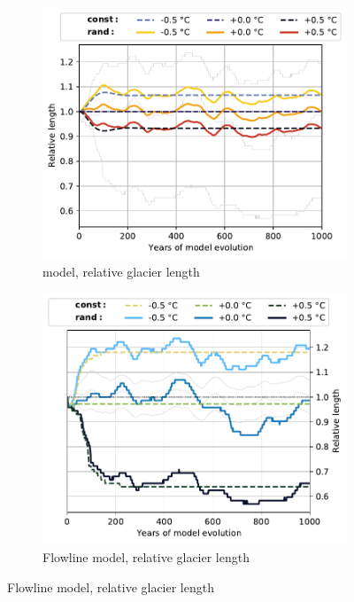 \begin{figure}[p]
  \begin{subfigure}[b]{0.476\textwidth}
    \caption{\Vas{} model, relative glacier length}
    \label{fig:Rhonegletscher:length_vas}
    \centering
    \includegraphics[width=\textwidth]{../plots/final_plots/time_series/single_glaciers/length_norm_vas_Rhonegletscher.pdf}
  \end{subfigure}
  \hfill
  \begin{subfigure}[b]{0.476\textwidth}
    \caption{Flowline model, relative glacier length}
    \label{fig:Rhonegletscher:length_fl}
    \centering
    \includegraphics[width=\textwidth]{../plots/final_plots/time_series/single_glaciers/length_norm_fl_Rhonegletscher.pdf}
  \end{subfigure}
  

\end{figure}
